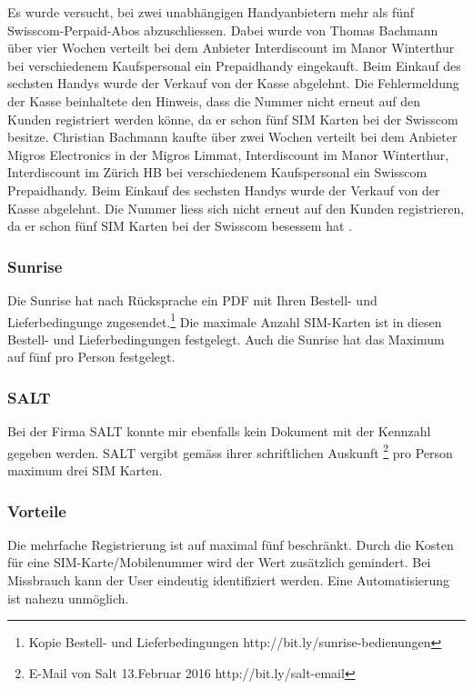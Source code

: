 Es wurde versucht, bei zwei unabhängigen Handyanbietern mehr als fünf
Swisscom-Perpaid-Abos abzuschliessen. Dabei wurde von Thomas Bachmann
über vier Wochen verteilt bei dem Anbieter Interdiscount im Manor
Winterthur bei verschiedenem Kaufspersonal ein Prepaidhandy eingekauft.
Beim Einkauf des sechsten Handys wurde der Verkauf von der Kasse
abgelehnt. Die Fehlermeldung der Kasse beinhaltete den Hinweis, dass die
Nummer nicht erneut auf den Kunden registriert werden könne, da er schon
fünf SIM Karten bei der Swisscom besitze. Christian Bachmann kaufte über
zwei Wochen verteilt bei dem Anbieter Migros Electronics in der Migros
Limmat, Interdiscount im Manor Winterthur, Interdiscount im Zürich HB
bei verschiedenem Kaufspersonal ein Swisscom Prepaidhandy. Beim Einkauf
des sechsten Handys wurde der Verkauf von der Kasse abgelehnt. Die
Nummer liess sich nicht erneut auf den Kunden registrieren, da er schon
fünf SIM Karten bei der Swisscom besessem hat .

\subsubsection{Sunrise}\label{sunrise}

Die Sunrise hat nach Rücksprache ein PDF mit Ihren Bestell- und
Lieferbedingunge zugesendet.\footnote{Kopie Bestell- und
  Lieferbedingungen http://bit.ly/sunrise-bedienungen} Die maximale
Anzahl SIM-Karten ist in diesen Bestell- und Lieferbedingungen
festgelegt. Auch die Sunrise hat das Maximum auf fünf pro Person
festgelegt.

\subsubsection{SALT}\label{salt}

Bei der Firma SALT konnte mir ebenfalls kein Dokument mit der Kennzahl
gegeben werden. SALT vergibt gemäss ihrer schriftlichen Auskunft
\footnote{E-Mail von Salt 13.Februar 2016 http://bit.ly/salt-email} pro
Person maximum drei SIM Karten.

\subsubsection{Vorteile}\label{vorteile-2}

Die mehrfache Registrierung ist auf maximal fünf beschränkt. Durch die
Kosten für eine SIM-Karte/Mobilenummer wird der Wert zusätzlich
gemindert. Bei Missbrauch kann der User eindeutig identifiziert werden.
Eine Automatisierung ist nahezu unmöglich.

